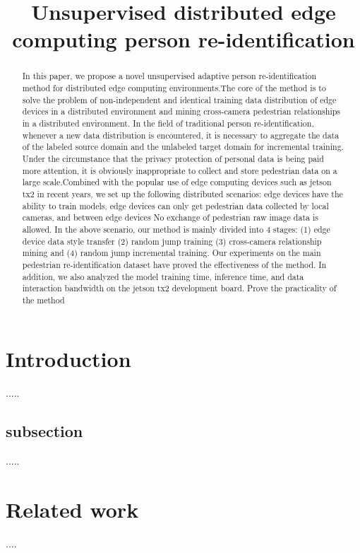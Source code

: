 \documentclass{article}
\title{Unsupervised distributed edge computing person re-identification}
\begin{document}
\maketitle

\begin{abstract}
    In this paper,  we propose a novel unsupervised adaptive person re-identification method for distributed edge computing environments.The core of the method is to solve the problem of non-independent and identical training data distribution of edge devices in a distributed environment and mining cross-camera pedestrian relationships in a distributed environment.
    In the field of traditional person re-identification, whenever a new data distribution is encountered, it is necessary to aggregate the data of the labeled source domain and the unlabeled target domain for incremental training.  Under the circumstance that the privacy protection of personal data is being paid more  attention, it is obviously inappropriate to collect and store pedestrian data on a large scale.Combined with the popular use of edge computing devices such as jetson tx2 in recent years, we set up the following distributed scenarios: edge devices have the ability to train models, edge devices can only get pedestrian data collected by local cameras, and between edge devices No exchange of pedestrian raw image data is allowed.
    In the above scenario, our method is mainly divided into 4 stages: (1) edge device data style transfer (2) random jump training (3) cross-camera relationship mining and (4) random jump incremental training.
    Our experiments on the main pedestrian re-identification dataset have proved the effectiveness of the method. In addition, we also analyzed the model training time, inference time, and data interaction bandwidth on the jetson tx2 development board. Prove the practicality of the method
    
\end{abstract}

\section{Introduction}
.....

\subsection{subsection}
.....

\section{Related work}
....
\end{document}
